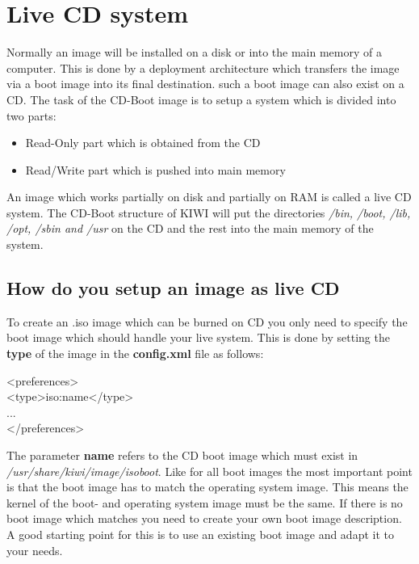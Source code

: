 \section{Live CD system}
Normally an image will be installed on a disk or into the
main memory of a computer. This is done by a deployment
architecture which transfers the image via a boot image
into its final destination. such a boot image can also
exist on a CD. The task of the CD-Boot image is to setup
a system which is divided into two parts:

\begin{itemize}
	\item Read-Only part which is obtained from the CD
	\item Read/Write part which is pushed into main memory
\end{itemize}

An image which works partially on disk and partially on RAM
is called a live CD system. The CD-Boot structure of KIWI will
put the directories \textit{/bin, /boot, /lib, /opt, /sbin and /usr}
on the CD and the rest into the main memory of the system.

\subsection{How do you setup an image as live CD}
To create an .iso image which can be burned on CD you only need
to specify the boot image which should handle your live system.
This is done by setting the \textbf{type} of the image in the
\textbf{config.xml} file as follows:

\begin{Command}{9cm}
<preferences>\\
\hspace*{1cm}<type>iso:name</type>\\
\hspace*{1cm}...\\
</preferences>
\end{Command}

The parameter \textbf{name} refers to the CD boot image which
must exist in \textit{/usr/share/kiwi/image/isoboot}. Like for all boot
images the most important point is that the boot image has to
match the operating system image. This means the kernel of the boot-
and operating system image must be the same. If there is no
boot image which matches you need to create your own boot image
description. A good starting point for this is to use an existing
boot image and adapt it to your needs.

